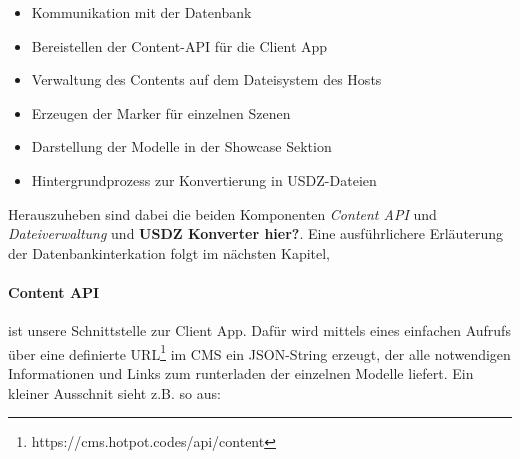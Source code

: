 \documentclass[titlepage, a4paper, 11pt]{scrartcl}
\begin{document}
        \begin{itemize}
          \item Kommunikation mit der Datenbank
          \item Bereistellen der Content-API für die Client App
          \item Verwaltung des Contents auf dem Dateisystem des Hosts
          \item Erzeugen der Marker für einzelnen Szenen
          \item Darstellung der Modelle in der Showcase Sektion
          \item Hintergrundprozess zur Konvertierung in USDZ-Dateien
        \end{itemize}

        Herauszuheben sind dabei die beiden Komponenten \textit{Content API} und \textit{Dateiverwaltung} und \textbf{USDZ Konverter hier?}. 
        Eine ausführlichere Erläuterung der Datenbankinterkation folgt im nächsten Kapitel,

        \paragraph{Content API} ist unsere Schnittstelle zur Client App. Dafür wird mittels eines einfachen Aufrufs über eine definierte URL\footnote{https://cms.hotpot.codes/api/content}
        im CMS ein JSON-String erzeugt, der alle notwendigen Informationen und Links zum runterladen der einzelnen Modelle liefert. Ein kleiner Ausschnit sieht z.B. so aus:
\end{document}
